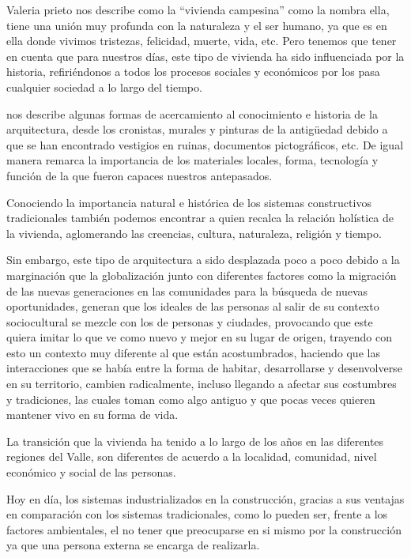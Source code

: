 Valeria prieto \citeyear{carrillo1978vivienda} nos describe como la ``vivienda campesina'' como la nombra ella, tiene una unión muy profunda con la naturaleza y el ser humano, ya que es en ella donde vivimos tristezas, felicidad, muerte, vida, etc. Pero tenemos que tener en cuenta que para nuestros días, este tipo de vivienda ha sido influenciada por la historia, refiriéndonos a todos los procesos sociales y económicos por los pasa cualquier sociedad a lo largo del tiempo.

\citeauthor{lopez1993arquitectura} nos describe algunas formas de acercamiento al conocimiento e historia de la arquitectura, desde los cronistas, murales y pinturas de la antigüedad debido a que se han encontrado vestigios en ruinas, documentos pictográficos, etc. De igual manera remarca la importancia de los materiales locales, forma, tecnología y función de la que fueron capaces nuestros antepasados.

Conociendo la importancia natural e histórica de los sistemas constructivos tradicionales también podemos encontrar a \citeauthor{zarate2009arquitectura} quien recalca la relación holística de la vivienda, aglomerando las creencias, cultura, naturaleza, religión y tiempo.

Sin embargo, este tipo de arquitectura a sido desplazada poco a poco debido a la marginación que la globalización junto con diferentes factores como la migración de las nuevas generaciones en las comunidades para la búsqueda de nuevas oportunidades, generan que los ideales de las personas al salir de su contexto sociocultural se mezcle con los de personas y ciudades, provocando que este quiera imitar lo que ve como nuevo y mejor en su lugar de origen, trayendo con esto un contexto muy diferente al que están acostumbrados, haciendo que las interacciones que se había entre la forma de habitar, desarrollarse y desenvolverse en su territorio, cambien radicalmente, incluso llegando a afectar sus costumbres y tradiciones, las cuales toman como algo antiguo y que pocas veces quieren mantener vivo en su forma de vida. 

La transición que la vivienda ha tenido a lo largo de los años en las diferentes regiones del Valle, son diferentes de acuerdo a la localidad, comunidad, nivel económico y social de las personas.

Hoy en día, los sistemas industrializados en la construcción, gracias a sus ventajas en comparación con los sistemas tradicionales, como lo pueden ser, frente a los factores ambientales, el no tener que preocuparse en si mismo por la construcción ya que una persona externa se encarga de realizarla. 

